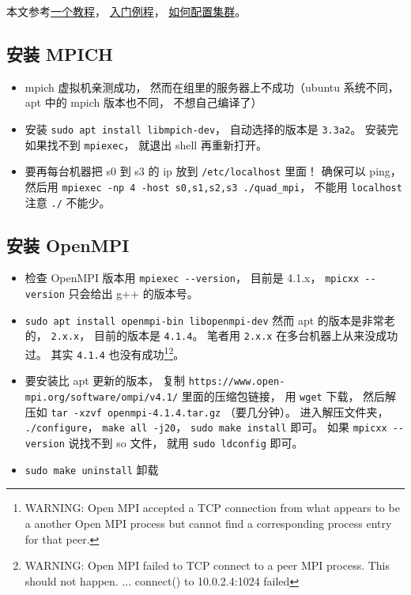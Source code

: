 
\begin{issues}
\issueDraft
\end{issues}

本文参考\href{https://www.codingame.com/playgrounds/349/introduction-to-mpi/introduction-to-distributed-computing}{一个教程}， \href{https://people.sc.fsu.edu/~jburkardt/cpp_src/hello_mpi/hello_mpi.html}{入门例程}， \href{https://mpitutorial.com/tutorials/running-an-mpi-cluster-within-a-lan/}{如何配置集群}。

\subsection{安装 MPICH}
\begin{itemize}
\item mpich 虚拟机亲测成功， 然而在组里的服务器上不成功（ubuntu 系统不同， apt 中的 mpich 版本也不同， 不想自己编译了）
\item 安装 \verb|sudo apt install libmpich-dev|， 自动选择的版本是 \verb|3.3a2|。 安装完如果找不到 \verb|mpiexec|， 就退出 shell 再重新打开。
\item 要再每台机器把 s0 到 s3 的 ip 放到 \verb|/etc/localhost| 里面！ 确保可以 ping， 然后用 \verb|mpiexec -np 4 -host s0,s1,s2,s3 ./quad_mpi|， 不能用 \verb|localhost| 注意 \verb|./| 不能少。
\end{itemize}

\subsection{安装 OpenMPI}
\begin{itemize}
\item 检查 OpenMPI 版本用 \verb|mpiexec --version|， 目前是 4.1.x， \verb|mpicxx --version| 只会给出 g++ 的版本号。
\item \verb|sudo apt install openmpi-bin libopenmpi-dev| 然而 apt 的版本是非常老的， \verb|2.x.x|， 目前的版本是 \verb|4.1.4|。 笔者用 \verb|2.x.x| 在多台机器上从来没成功过。 其实 \verb|4.1.4| 也没有成功\footnote{WARNING: Open MPI accepted a TCP connection from what appears to be a another Open MPI process but cannot find a corresponding process entry for that peer.}\footnote{WARNING: Open MPI failed to TCP connect to a peer MPI process.  This should not happen. ... connect() to 10.0.2.4:1024 failed}。
\item 要安装比 apt 更新的版本， 复制 \verb|https://www.open-mpi.org/software/ompi/v4.1/| 里面的压缩包链接， 用 \verb|wget| 下载， 然后解压如 \verb|tar -xzvf openmpi-4.1.4.tar.gz| （要几分钟）。 进入解压文件夹， \verb|./configure|， \verb|make all -j20|， \verb|sudo make install| 即可。 如果 \verb|mpicxx --version| 说找不到 so 文件， 就用 \verb|sudo ldconfig| 即可。
\item \verb|sudo make uninstall| 卸载
\end{itemize}

